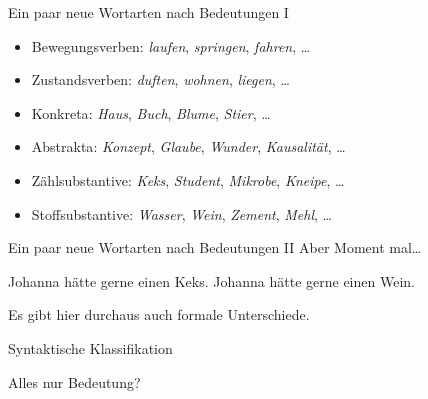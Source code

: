 \begin{frame}
  {Ein paar neue Wortarten nach Bedeutungen I}
  \pause
  \begin{itemize}[<+->]
    \item \alert{Bewegungsverben}: \textit{laufen}, \textit{springen}, \textit{fahren}, \dots
    \item \alert{Zustandsverben}: \textit{duften}, \textit{wohnen}, \textit{liegen}, \dots
      \Halbzeile
    \item \alert{Konkreta}: \textit{Haus}, \textit{Buch}, \textit{Blume}, \textit{Stier}, \dots
    \item \alert{Abstrakta}: \textit{Konzept}, \textit{Glaube}, \textit{Wunder}, \textit{Kausalität}, \dots
      \Halbzeile
    \item \alert{Zählsubstantive}: \textit{Keks}, \textit{Student}, \textit{Mikrobe}, \textit{Kneipe}, \dots
    \item \alert{Stoffsubstantive}: \textit{Wasser}, \textit{Wein}, \textit{Zement}, \textit{Mehl}, \dots
  \end{itemize}
\end{frame}

\begin{frame}
  {Ein paar neue Wortarten nach Bedeutungen II}
  \pause
  Aber Moment mal\dots\\
  \pause
  \Zeile
  \begin{exe}
   \ex
   \begin{xlist}
   \end{xlist}
    \pause
    \ex
    \begin{xlist}
      \ex Johanna hätte gerne \alert{einen Keks}.
      \ex Johanna hätte gerne \alert{einen Wein}.
    \end{xlist}
  \end{exe}
  \pause
  \Zeile
  Es gibt hier durchaus auch \alert{formale} Unterschiede.
\end{frame}


\begin{frame}
  {Syntaktische Klassifikation}
  \pause
  \begin{exe}
    \ex
    \begin{xlist}
      \pause
      \pause
      \pause
    \end{xlist}
    \pause
    \Zeile
    \ex
    \begin{xlist}
      \pause
    \end{xlist}
  \end{exe}
    \pause
    \Zeile
    \centering 
    Alles nur Bedeutung?
\end{frame}

